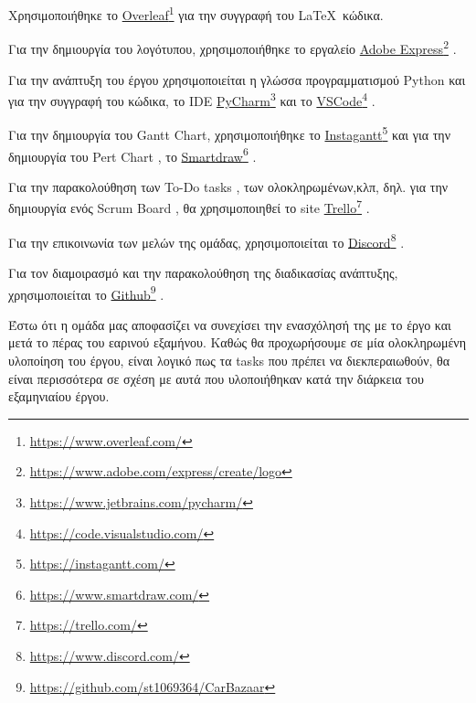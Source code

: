 \documentclass{../ol-softwaremanual}
\newcommand{\doclink}[2]{\href{#1}{#2}\footnote{\url{#1}}}
\begin{document}
	
	\vspace{20pt}
	
	
	\vspace{20pt}
	\flushleft
	Χρησιμοποιήθηκε το \en \doclink{https://www.overleaf.com/}{Overleaf} \gr για την συγγραφή του \LaTeX\ κώδικα. \break
	
	Για την δημιουργία του λογότυπου, χρησιμοποιήθηκε το εργαλείο \en \doclink{https://www.adobe.com/express/create/logo}{Adobe Express} . \gr \break
	
	Για την ανάπτυξη του έργου χρησιμοποιείται η γλώσσα προγραμματισμού \en Python \gr και για την συγγραφή του κώδικα, το \en IDE \doclink{https://www.jetbrains.com/pycharm/}{PyCharm} \gr και το \en \doclink{https://code.visualstudio.com/}{VSCode} \gr .         \\ \break
	
	Για την δημιουργία του \en Gantt Chart, \gr χρησιμοποιήθηκε το \en \doclink{https://instagantt.com/}{Instagantt} \gr και για την δημιουργία του \en Pert Chart \gr, το \en \doclink{https://www.smartdraw.com/}{Smartdraw} \gr. \break 
	
	Για την παρακολούθηση των \en To-Do tasks \gr, των ολοκληρωμένων,κλπ, δηλ. για την δημιουργία ενός \en Scrum Board \gr, θα χρησιμοποιηθεί το \en site \doclink{https://trello.com/}{Trello} \gr. \break 
	
	Για την επικοινωνία των μελών της ομάδας, χρησιμοποιείται το \en \doclink{ https://www.discord.com/}{Discord} \gr . \linebreak 
	
	
	Για τον διαμοιρασμό και την παρακολούθηση της διαδικασίας ανάπτυξης, χρησιμοποιείται το \en \doclink{https://github.com/st1069364/CarBazaar}{Github} \gr.
	
	
	
	\newpage
	
	\flushleft
	
	\vspace{20pt}
	
	Έστω ότι η ομάδα μας αποφασίζει να συνεχίσει την ενασχόλησή της με το έργο και μετά το πέρας του εαρινού εξαμήνου. Καθώς θα προχωρήσουμε σε μία ολοκληρωμένη υλοποίηση του έργου, είναι λογικό πως τα \en tasks \gr που πρέπει να διεκπεραιωθούν, θα είναι περισσότερα σε σχέση με αυτά που υλοποιήθηκαν κατά την διάρκεια του εξαμηνιαίου έργου.
	
	\vspace{20pt}
	
\end{document}
